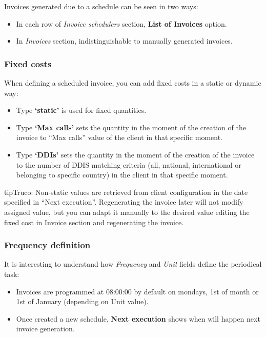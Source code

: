 \documentclass[letterpaper,10pt,spanish]{sphinxmanual}
\begin{document}
Invoices generated due to a schedule can be seen in two ways:
\begin{itemize}
\item {} 
In each row of \emph{Invoice schedulers} section, \textbf{List of Invoices} option.

\item {} 
In \emph{Invoices} section, indistinguishable to manually generated invoices.

\end{itemize}


\subsubsection{Fixed costs}
\label{administration_portal/brand/invoicing/invoice_schedulers:fixed-costs}
When defining a scheduled invoice, you can add fixed costs in a static or dynamic way:
\begin{itemize}
\item {} 
Type \textbf{`static'} is used for fixed quantities.

\item {} 
Type \textbf{`Max calls'} sets the quantity in the moment of the creation of the invoice to
``Max calls'' value of the client in that specific moment.

\item {} 
Type \textbf{`DDIs'} sets the quantity in the moment of the creation of the invoice to
the number of DDIS matching criteria (all, national, international or belonging to specific country)
in the client in that specific moment.

\end{itemize}

\begin{notice}{tip}{Truco:}
Non-static values are retrieved from client configuration in the date specified in ``Next execution''.
Regenerating the invoice later will not modify assigned value, but you can adapt it manually to
the desired value editing the fixed cost in Invoice section and regenerating the invoice.
\end{notice}


\subsubsection{Frequency definition}
\label{administration_portal/brand/invoicing/invoice_schedulers:frequency-definition}
It is interesting to understand how \emph{Frequency} and \emph{Unit} fields define the periodical task:
\begin{itemize}
\item {} 
Invoices are programmed at 08:00:00 by default on mondays, 1st of month or 1st of January (depending on Unit value).

\item {} 
Once created a new schedule, \textbf{Next execution} shows when will happen next invoice generation.

\end{itemize}
\end{document}
